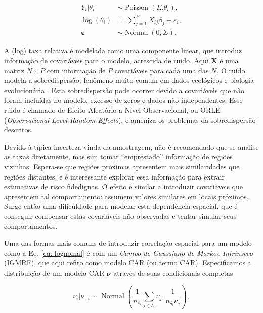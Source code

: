 \begin{equation}\label{eq: lognomal}
\begin{split}
    Y_i|\theta_i &\sim \operatorname{Poisson}(E_i \theta_i),\\
    \log(\theta_i) &= \sum_{j=1}^P X_{ij}\beta_j + \varepsilon_i,\\
    \boldsymbol{\varepsilon} &\sim \operatorname{Normal}(0,\Sigma).
\end{split}
\end{equation}

A (log) taxa relativa é modelada como uma componente linear, que introduz informação de covariáveis para o modelo, acrescida de ruído. Aqui $\mathbf{X}$ é uma matriz $N \times P$ com informação de $P$ covariáveis para cada uma das $N$. O ruído modela a sobredispersão, fenômeno muito comum em dados ecológicos e biologia evolucionária \cite{Harrison2014-up}. Esta sobredispersão pode ocorrer devido a covariáveis que não foram incluídas no modelo, excesso de zeros e dados não independentes. Esse rúido é chamado de Efeito Aleatório a Nível Observacional, ou  ORLE (\textit{Observational Level Random Effects}), e ameniza os problemas da sobredispersão descritos. 


Devido à típica incerteza vinda da amostragem, não é recomendado que se analise as taxas diretamente, mas sim tomar ``emprestado'' informação de regiões vizinhas. Espera-se que regiões próximas apresentem mais similaridades que regiões distantes, e é interessante explorar essa informação para extrair estimativas de risco fidedignas.
O efeito é similar a introduzir covariáveis que apresentem tal comportamento: assumem valores similares em locais próximos.
Surge então uma dificuldade para modelar esta dependência espacial, que é conseguir compensar estas covariáveis não observadas e tentar simular seus comportamentos. 

Uma das formas mais comuns de introduzir correlação espacial para um modelo como a Eq. \eqref{eq: lognomal} é com um \textit{Campo de Gaussiano de Markov Intrínseco} (IGMRF), que aqui refiro como modelo CAR (ou termo CAR).
Especificamos a distribuição de um modelo CAR $\boldsymbol{\nu}$ através de suas condicionais completas

\begin{equation*}
    \nu_i | \nu_{-i} \sim \operatorname{Normal}\left(\frac{1}{n_{\delta_i}}\sum_{j \in \delta_i} \nu_j, \frac{1}{n_{\delta_i} \kappa_i}\right),
\end{equation*}

